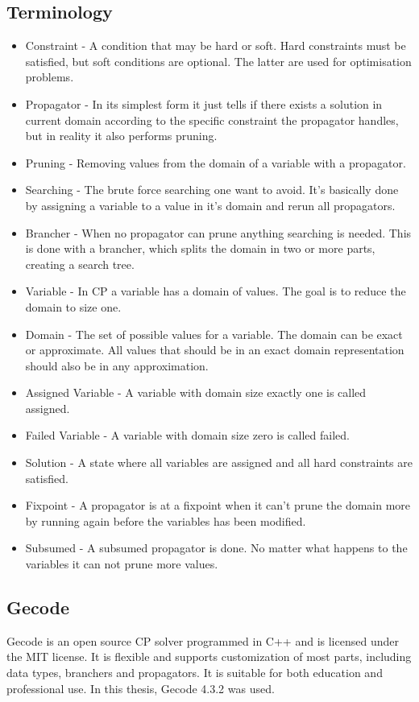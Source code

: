\documentclass[a4paper,11pt]{article}
\begin{document}
\subsection{Terminology}
\begin{itemize}
\item{Constraint} - A condition that may be hard or soft. Hard constraints must be satisfied, but soft conditions are optional. The latter are used for optimisation problems.
\item{Propagator} - In its simplest form it just tells if there exists a solution in current domain according to the specific constraint the propagator handles, but in reality it also performs pruning.
\item{Pruning} - Removing values from the domain of a variable with a propagator.
\item{Searching} - The brute force searching one want to avoid. It's basically done by assigning a variable to a value in it's domain and rerun all propagators.
\item{Brancher} - When no propagator can prune anything searching is needed. This is done with a brancher, which splits the domain in two or more parts, creating a search tree.
\item{Variable} - In CP a variable has a domain of values. The goal is to reduce the domain to size one.
\item{Domain} - The set of possible values for a variable. The domain can be exact or approximate. All values that should be in an exact domain representation should also be in any approximation.
\item{Assigned Variable} - A variable with domain size exactly one is called assigned.
\item{Failed Variable} - A variable with domain size zero is called failed.
\item{Solution} - A state where all variables are assigned and all hard constraints are satisfied.
\item{Fixpoint} - A propagator is at a fixpoint when it can't prune the domain more by running again before the variables has been modified.
\item{Subsumed} - A subsumed propagator is done. No matter what happens to the variables it can not prune more values.
\end{itemize}

\subsection{Gecode}
Gecode is an open source CP solver programmed in C++ and is licensed under the MIT license. It is flexible and supports customization of most parts, including data types, branchers and propagators. It is suitable for both education and professional use. In this thesis, Gecode 4.3.2 was used.
\end{document}
